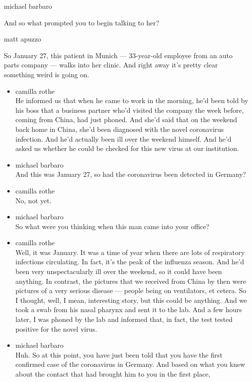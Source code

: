 michael barbaro

And so what prompted you to begin talking to her?

matt apuzzo

So January 27, this patient in Munich --- 33-year-old employee from an
auto parts company --- walks into her clinic. And right away it's pretty
clear something weird is going on.

\begin{itemize}
\item
  camilla rothe\\
  He informed us that when he came to work in the morning, he'd been
  told by his boss that a business partner who'd visited the company the
  week before, coming from China, had just phoned. And she'd said that
  on the weekend back home in China, she'd been diagnosed with the novel
  coronavirus infection. And he'd actually been ill over the weekend
  himself. And he'd asked us whether he could be checked for this new
  virus at our institution.
\item
  michael barbaro\\
  And this was January 27, so had the coronavirus been detected in
  Germany?
\item
  camilla rothe\\
  No, not yet.
\item
  michael barbaro\\
  So what were you thinking when this man came into your office?
\item
  camilla rothe\\
  Well, it was January. It was a time of year when there are lots of
  respiratory infections circulating. In fact, it's the peak of the
  influenza season. And he'd been very unspectacularly ill over the
  weekend, so it could have been anything. In contrast, the pictures
  that we received from China by then were pictures of a very serious
  disease --- people being on ventilators, et cetera. So I thought,
  well, I mean, interesting story, but this could be anything. And we
  took a swab from his nasal pharynx and sent it to the lab. And a few
  hours later, I was phoned by the lab and informed that, in fact, the
  test tested positive for the novel virus.
\item
  michael barbaro\\
  Huh. So at this point, you have just been told that you have the first
  confirmed case of the coronavirus in Germany. And based on what you
  knew about the contact that had brought him to you in the first place,

\end{itemize}
